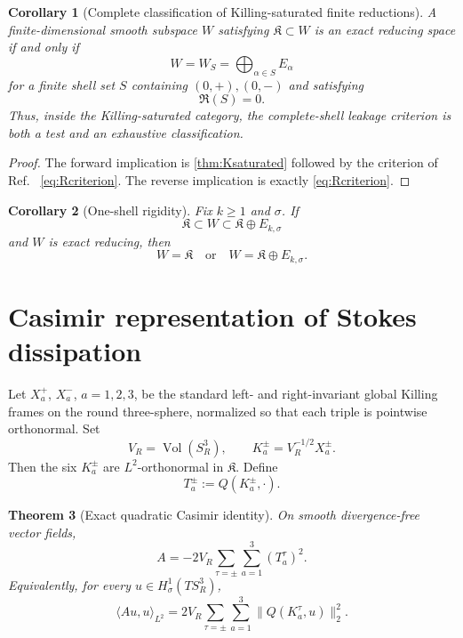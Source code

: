 \documentclass[
 aps,
 prd,
 reprint,
 amsmath,
 amssymb,
 nofootinbib,
 superscriptaddress
]{revtex4-2}
\newtheorem{theorem}{Theorem}[section]
\newtheorem{corollary}[theorem]{Corollary}
\theoremstyle{definition}
\theoremstyle{remark}
\newcommand{\Sthree}{S^3_R}
\newcommand{\Vol}{\operatorname{Vol}}
\newcommand{\cK}{\mathfrak K}
\begin{document}
\begin{corollary}[Complete classification of Killing-saturated finite reductions]
\label{cor:Ksaturatedclassification}
A finite-dimensional smooth subspace $W$ satisfying $\cK\subset W$ is an
exact reducing space if and only if
\[
 W=W_S=
 \bigoplus_{\alpha\in S}E_\alpha
\]
for a finite shell set $S$ containing $(0,+),(0,-)$ and satisfying
\begin{equation}
 \boxed{\mathfrak R(S)=0.}
 \label{eq:KsatR}
\end{equation}
Thus, inside the Killing-saturated category, the complete-shell leakage
criterion is both a test and an exhaustive classification.
\end{corollary}

\begin{proof}
The forward implication is \cref{thm:Ksaturated} followed by the criterion of Ref.~\cite{PreeceBatenin2026} \eqref{eq:Rcriterion}.  The reverse implication is exactly
\eqref{eq:Rcriterion}.
\end{proof}

\begin{corollary}[One-shell rigidity]
Fix $k\ge1$ and $\sigma$.  If
\[
 \cK\subset W\subset\cK\oplus E_{k,\sigma}
\]
and $W$ is exact reducing, then
\[
 W=\cK
 \quad\text{or}\quad
 W=\cK\oplus E_{k,\sigma}.
\]
\end{corollary}




\section{Casimir representation of Stokes dissipation}
\label{sec:casimir}

Let $X_a^+$, $X_a^-$, $a=1,2,3$, be the standard left- and right-invariant
global Killing frames on the round three-sphere, normalized so that each
triple is pointwise orthonormal.  Set
\[
 V_R=\Vol(\Sthree),\qquad
 K_a^\pm=V_R^{-1/2}X_a^\pm.
\]
Then the six $K_a^\pm$ are $L^2$-orthonormal in $\cK$.
Define
\[
 T_a^\pm:=Q(K_a^\pm,\cdot).
\]

\begin{theorem}[Exact quadratic Casimir identity]
\label{thm:Tcasimir}
On smooth divergence-free vector fields,
\begin{equation}
 \boxed{
 A=-2V_R\sum_{\tau=\pm}\sum_{a=1}^3(T_a^\tau)^2.
 }
 \label{eq:Tcasimir}
\end{equation}
Equivalently, for every $u\in H^1_\sigma(T\Sthree)$,
\begin{equation}
 \boxed{
 \langle Au,u\rangle_{L^2}
 =
 2V_R\sum_{\tau=\pm}\sum_{a=1}^3
 \|Q(K_a^\tau,u)\|_2^2.
 }
 \label{eq:Tcasimirform}
\end{equation}
\end{theorem}
\end{document}
